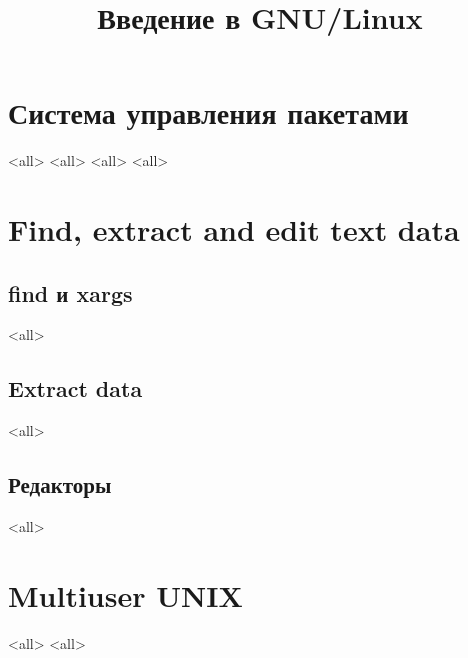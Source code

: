 

\title{Введение в GNU/Linux}








\begin{frame}
	\frametitle{}
	\titlepage
	\vspace{-0.5cm}
	\begin{center}
	\end{center}
\end{frame}




\section{Система управления пакетами}
\mode<all>{}
\mode<all>{}
\mode<all>{}
\mode<all>{}

\section{Find, extract and edit text data}
\subsection{find и xargs}
\mode<all>{}
\subsection{Extract data}
\mode<all>{}
\subsection{Редакторы}
\mode<all>{}

\section{Multiuser UNIX}
\mode<all>{}
\mode<all>{}

